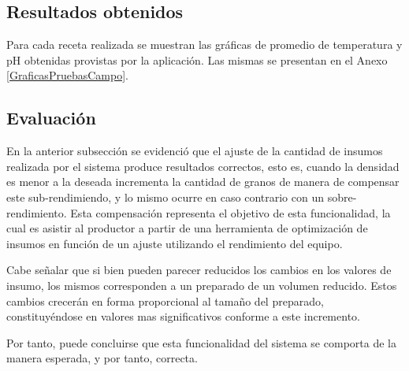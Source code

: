     \subsection{Resultados obtenidos}
        \par Para cada receta realizada se muestran las gráficas de promedio de temperatura y pH obtenidas provistas por la aplicación. Las mismas se presentan en el Anexo \ref{GraficasPruebasCampo}.
        

            
    \subsection{Evaluación}
    \par En la anterior subsección se evidenció que el ajuste de la cantidad de insumos realizada por el sistema produce resultados correctos, esto es, cuando la densidad es menor a la deseada incrementa la cantidad de granos de manera de compensar este sub-rendimiendo, y lo mismo ocurre en caso contrario con un sobre-rendimiento. Esta compensación representa el objetivo de esta funcionalidad, la cual es asistir al productor a partir de una herramienta de optimización de insumos en función de un ajuste utilizando el rendimiento del equipo.
    \par Cabe señalar que si bien pueden parecer reducidos los cambios en los valores de insumo, los mismos corresponden a un preparado de un volumen reducido. Estos cambios crecerán en forma proporcional al tamaño del preparado, constituyéndose en valores mas significativos conforme a este incremento.
    \par Por tanto, puede concluirse que esta funcionalidad del sistema se comporta de la manera esperada, y por tanto, correcta. 
    
    
        
        
